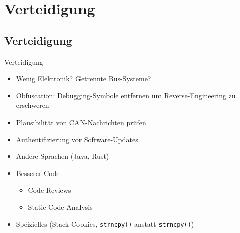\section{Verteidigung}

\subsection{Verteidigung}

\begin{frame}[fragile]{Verteidigung}
    \begin{itemize}[<+->]
        \item Wenig Elektronik? Getrennte Bus-Systeme?
        \item Obfuscation: Debugging-Symbole entfernen um Reverse-Engineering
              zu erschweren
        \item Plausibilität von CAN-Nachrichten prüfen
        \item Authentifizierung vor Software-Updates
        \item Andere Sprachen (Java, Rust)
        \item Besserer Code
        \begin{itemize}
            \item Code Reviews
            \item Static Code Analysis
        \end{itemize}
        \item Speizielles (Stack Cookies, \verb+strncpy()+ anstatt \verb+strncpy()+)
    \end{itemize}
\end{frame}